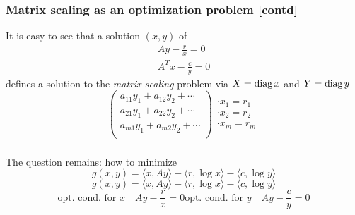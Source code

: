 \documentclass{beamer}
\begin{document}
\begin{frame}
  \frametitle{Matrix scaling as an optimization problem [contd]}
  It is easy to see that a solution $(x,y)$ of
  \begin{equation}
    \begin{aligned}
      Ay - \frac{r}{x} = 0 \\
      A^T x - \frac{c}{y} = 0
    \end{aligned}
  \end{equation}
  defines a solution to the \emph{matrix scaling} problem via $X=\operatorname*{diag} x$ and $Y=\operatorname*{diag} y$
  \begin{equation}
    \left(\begin{array}{c}
            a_{1 1} y_1 + a_{1 2} y_2 + \cdots \\
            a_{2 1} y_1 + a_{2 2} y_2 + \cdots \\
            a_{m 1} y_1 + a_{m 2} y_2 + \cdots \\
          \end{array}\right)
        \begin{array}{c}
          \cdot x_1 = r_1\\
          \cdot x_2 = r_2\\
          \cdot x_m = r_m
        \end{array}
      \end{equation}
\end{frame}

\begin{frame}
  \frametitle{}
  The question remains: how to minimize
  \begin{equation}
    g(x,y) = \langle x, A y \rangle - \langle r, \log x \rangle - \langle c, \log y \rangle
  \end{equation}
  \begin{equation}
    g(x,y) = \langle x, A y \rangle - \langle r, \log x \rangle - \langle c, \log y \rangle
  \end{equation}
  \begin{equation}
    \text{opt. cond.\ for $x$} \quad Ay - \frac{r}{x} = 0
    \text{opt. cond.\ for $y$} \quad Ay - \frac{c}{y} = 0
  \end{equation}
\end{frame}
\end{document}

